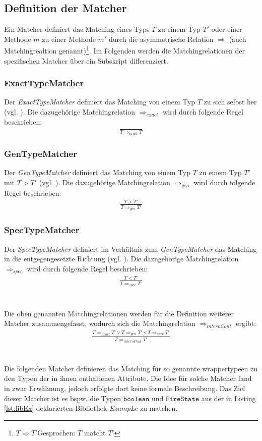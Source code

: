 \subsection{Definition der Matcher}\label{sec_matcher}
Ein Matcher definiert das Matching eines Typs $T$ zu einem Typ $T'$ oder einer Methode $m$ zu einer Methode $m'$ durch die asymmetrische Relation $\Rightarrow$ (auch Matchingrealtion genannt)\footnote{$T \Rightarrow T'$\newline Gesprochen: $T$ matcht $T'$}. Im Folgenden werden die Matchingrelationen der spezifischen Matcher über ein Subskript differenziert.
\subsubsection{ExactTypeMatcher}\label{sec:exacttypematcher}
Der \emph{ExactTypeMatcher} definiert das Matching von einem Typ $T$ zu sich selbst her (vgl. \cite{moormann}). Die dazugehörige Matchingrelation $\Rightarrow_{exact}$ wird durch folgende Regel beschrieben:
\begin{gather*}
\frac{}{T \Rightarrow_{exact} T}
\end{gather*}
\subsubsection{GenTypeMatcher}\label{sec:gentypematcher}
Der \emph{GenTypeMatcher} definiert das Matching von einem Typ $T$ zu einem Typ $T'$ mit $T > T'$ (vgl. \cite{moormann}). Die dazugehörige Matchingrelation $\Rightarrow_{gen}$ wird durch folgende Regel beschrieben:
\begin{gather*}
\frac{T > T'}{T \Rightarrow_{gen} T'}
\end{gather*}
\subsubsection{SpecTypeMatcher}
Der \emph{SpecTypeMatcher} definiert im Verhältnis zum \emph{GenTypeMatcher} das Matching in die entgegengesetzte Richtung (vgl. \cite{moormann}). Die dazugehörige Matchingrelation $\Rightarrow_{spec}$ wird durch folgende Regel beschrieben: 
\begin{gather*}
\frac{T < T'}{T \Rightarrow_{spec} T'}
\end{gather*}
\\\\
Die oben genannten Matchingrelationen werden für die Definition weiterer Matcher zusammengefasst, wodurch sich die Matchingrelation $\Rightarrow_{internCont}$ ergibt:
\begin{gather*}
\frac{T \Rightarrow_{exact} T' \vee T \Rightarrow_{gen} T' \vee
T \Rightarrow_{spec} T'  }{T \Rightarrow_{internCont} T'}
\end{gather*}
\noindent
\\\\
Die folgenden Matcher definieren das Matching für so genannte \Gls{wrappertype}en zu den Typen der in ihnen enthaltenen Attribute. Die Idee für solche Matcher fand in \cite{hummel08} zwar Erwähnung, jedoch erfolgte dort keine formale Beschreibung. Das Ziel dieser Matcher ist es bspw. die Typen $\texttt{boolean}$ und $\texttt{FireState}$ aus der in Listing \ref{lst:libEx} deklarierten Bibliothek \emph{ExampLe} zu matchen.
